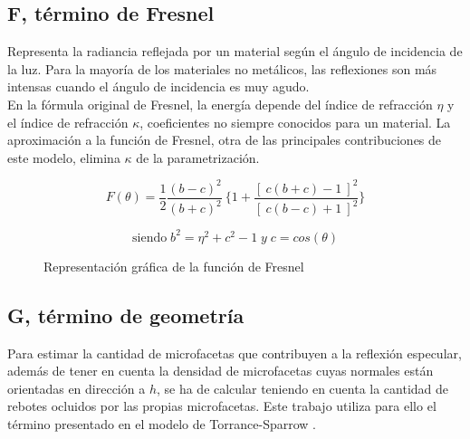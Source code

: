             \subsection*{F, t\'ermino de Fresnel}
            Representa la radiancia reflejada por un material seg\'un el \'angulo de incidencia
            de la luz. Para la mayor\'ia de los materiales no met\'alicos, las reflexiones son m\'as intensas cuando el \'angulo
            de incidencia es muy agudo.\\

            En la f\'ormula original de Fresnel, la energ\'ia depende del \'indice de refracci\'on $\eta$ y el \'indice de refracci\'on
            $\kappa$, coeficientes no siempre conocidos para un material. La aproximaci\'on a la funci\'on de Fresnel, otra de las
            principales contribuciones de este modelo, elimina $\kappa$ de la parametrizaci\'on.

            $$
            F(\theta) = 
            \frac{1}{2}
            \frac{(b - c)^2}{(b + c)^2}\
            \bigg\{
                1 +
                \frac{[ \ c(b + c) - 1 \ ]^2}{[ \ c(b - c) + 1 \ ]^2}
            \bigg\}
            $$

            \begin{equation}
                \textrm{siendo} \; b^2 = \eta^2 + c^2 - 1 \; y \; c = cos(\theta)
            \end{equation}
    
            \begin{figure}[H]
                \vspace{0.5cm}
                \centering
                \caption{Representaci\'on gr\'afica de la funci\'on de Fresnel}
                \vspace{0.5cm}
            \end{figure}
            \singlespacing

    
            \subsection*{G, t\'ermino de geometr\'ia}
            Para estimar la cantidad de microfacetas que contribuyen a la reflexi\'on especular, adem\'as de tener en cuenta
            la densidad de microfacetas cuyas normales est\'an orientadas en direcci\'on a $h$, se ha de calcular teniendo en
            cuenta la cantidad de rebotes ocluidos por las propias microfacetas. Este trabajo utiliza para ello el t\'ermino
            presentado en el modelo de Torrance-Sparrow \autocite{torrancesparrow}.\\


